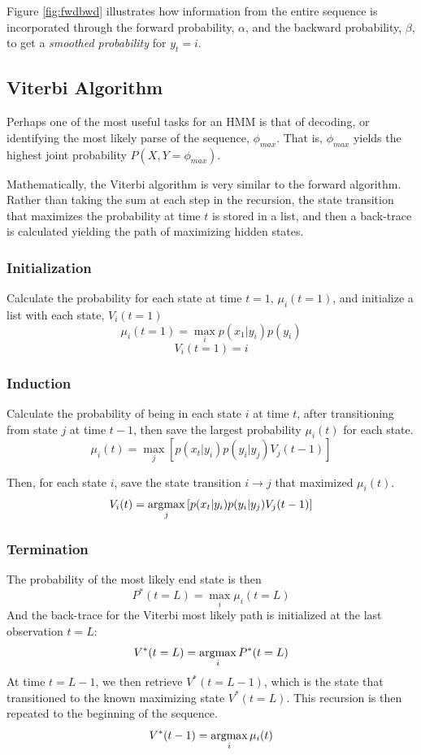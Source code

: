 Figure \ref{fig:fwdbwd} illustrates how information from the entire sequence is incorporated through the forward probability, $\alpha$, and the backward probability, $\beta$, to get a \emph{smoothed probability} for $y_t = i$.

\subsection{Viterbi Algorithm}
Perhaps one of the most useful tasks for an HMM is that of decoding, or identifying the most likely parse of the sequence, $\phi_{max}$. That is, $\phi_{max}$ yields the highest joint probability $P(X,Y=\phi_{max})$. 

Mathematically, the Viterbi algorithm is very similar to the forward algorithm. Rather than taking the sum at each step in the recursion, the state transition that maximizes the probability at time $t$ is stored in a list, and then a back-trace is calculated yielding the path of maximizing hidden states.

\subsubsection{Initialization}
Calculate the probability for each state at time $t=1$, $\mu_i(t=1)$, and initialize a list with each state, $V_i(t=1)$
\begin{equation}
    \mu_i(t=1) = \max_i p(x_1|y_i)p(y_i)
\label{eq:fwdinit}
\end{equation}
$$    V_i(t=1) = i$$
\subsubsection{Induction}
Calculate the probability of being in each state $i$ at time $t$, after transitioning from state $j$ at time $t-1$, then save the largest probability $\mu_i(t)$ for each state. 
\begin{equation}
    \mu_i(t) =\max_j\left[p(x_t|y_i)p(y_i|y_j)V_j(t-1)\right]
\label{eq:fwdinduc}
\end{equation}

Then, for each state $i$, save the state transition $i\rightarrow j$ that maximized $\mu_i(t)$.  
$$V_i(t) =\operatorname*{argmax}_j\left[p(x_t|y_i)p(y_i|y_j)V_j(t-1)\right]$$

\subsubsection{Termination}
The probability of the most likely end state is then
\begin{equation}
    P^*(t=L) = \max_i{\mu_i(t=L)}
\label{eq:fwdterm}
\end{equation}
And the back-trace for the Viterbi most likely path is initialized at the last observation $t=L$:
$$V^*(t=L) = \operatorname*{argmax}_i{P^*(t=L)}$$
At time $t=L-1$, we then retrieve $V^*(t=L-1)$, which is the state that transitioned to the known maximizing state $V^*(t=L)$. This recursion is then repeated to the beginning of the sequence.
\begin{equation}
V^*(t-1) = \operatorname*{argmax}_i{\mu_i(t)}
\label{eq:backtrace}    
\end{equation}

